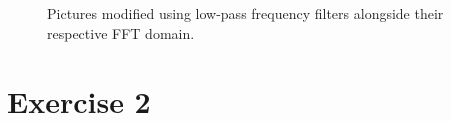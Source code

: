 \documentclass[a4paper]{article}
\begin{document}
\begin{figure}[!htb]
  \quad
	\caption{Pictures modified using low-pass frequency filters alongside their respective FFT domain.}
  \label{fig:ex_one_fft}
\end{figure}

\clearpage





\section*{Exercise 2}
\end{document}
